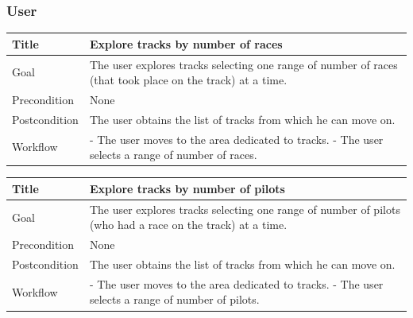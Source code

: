 \documentclass{beamer}
\begin{document}
\begin{frame}
    \frametitle{User}
    \begin{table}
        \tiny
        \begin{tabular}{|p{2cm}|p{6cm}|}
        \hline
        Title & \textbf{Explore tracks by number of races} \\
        \hline
        Goal & The user explores tracks selecting one range of number of races
        (that took place on the track) at a time. \\ 
        \hline
        Precondition & None \\
        \hline
        Postcondition & The user obtains the list of tracks from which he can move on.\\
        \hline
        Workflow &
        - The user moves to the area dedicated to tracks. \newline
        - The user selects a range of number of races. \\
        \hline
        \end{tabular}
\end{table}

\begin{table}
    \tiny
    \begin{tabular}{|p{2cm}|p{6cm}|}
    \hline
    Title & \textbf{Explore tracks by number of pilots} \\
    \hline
    Goal & The user explores tracks selecting one range of number of pilots
    (who had a race on the track) at a time. \\
    \hline
    Precondition & None \\
    \hline
    Postcondition & The user obtains the list of tracks from which he can move on.\\
    \hline
    Workflow &
    - The user moves to the area dedicated to tracks. \newline
    - The user selects a range of number of pilots. \\
    \hline
    \end{tabular}
\end{table}
\end{frame}


\end{document}
